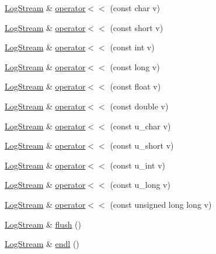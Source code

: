 \begin{DoxyCompactItemize}
\item 
\hyperlink{classkisscpp_1_1_log_stream}{Log\-Stream} \& \hyperlink{classkisscpp_1_1_log_stream_a1d015fcec83dc091a2cb474ff5d335ce}{operator$<$$<$} (const char v)
\item 
\hyperlink{classkisscpp_1_1_log_stream}{Log\-Stream} \& \hyperlink{classkisscpp_1_1_log_stream_a64e3c679c6f5392587aa5d0d30083b12}{operator$<$$<$} (const short v)
\item 
\hyperlink{classkisscpp_1_1_log_stream}{Log\-Stream} \& \hyperlink{classkisscpp_1_1_log_stream_a846256cf761f4601ef3637b6696119d7}{operator$<$$<$} (const int v)
\item 
\hyperlink{classkisscpp_1_1_log_stream}{Log\-Stream} \& \hyperlink{classkisscpp_1_1_log_stream_a82903610e544b37167f2dbd3709feeab}{operator$<$$<$} (const long v)
\item 
\hyperlink{classkisscpp_1_1_log_stream}{Log\-Stream} \& \hyperlink{classkisscpp_1_1_log_stream_adfa23ba1edc6f3d4c68169a0fd5e6ab0}{operator$<$$<$} (const float v)
\item 
\hyperlink{classkisscpp_1_1_log_stream}{Log\-Stream} \& \hyperlink{classkisscpp_1_1_log_stream_a117bd78b19cb5cb22aceda49a7e464a6}{operator$<$$<$} (const double v)
\item 
\hyperlink{classkisscpp_1_1_log_stream}{Log\-Stream} \& \hyperlink{classkisscpp_1_1_log_stream_a093fb47653a508743fbdc8849d0b3289}{operator$<$$<$} (const u\-\_\-char v)
\item 
\hyperlink{classkisscpp_1_1_log_stream}{Log\-Stream} \& \hyperlink{classkisscpp_1_1_log_stream_ac58b43508e33bf908dcd3e1ced0844a5}{operator$<$$<$} (const u\-\_\-short v)
\item 
\hyperlink{classkisscpp_1_1_log_stream}{Log\-Stream} \& \hyperlink{classkisscpp_1_1_log_stream_ac90a6103239d03af4deabb771a06ef72}{operator$<$$<$} (const u\-\_\-int v)
\item 
\hyperlink{classkisscpp_1_1_log_stream}{Log\-Stream} \& \hyperlink{classkisscpp_1_1_log_stream_a30aa88e723ce04fe2e23ce6e939671cf}{operator$<$$<$} (const u\-\_\-long v)
\item 
\hyperlink{classkisscpp_1_1_log_stream}{Log\-Stream} \& \hyperlink{classkisscpp_1_1_log_stream_ae7a5fbc7cc973038722e2c2b9de9ad1b}{operator$<$$<$} (const unsigned long long v)
\item 
\hyperlink{classkisscpp_1_1_log_stream}{Log\-Stream} \& \hyperlink{classkisscpp_1_1_log_stream_a2814d0297db8339779e995c898861e0e}{flush} ()
\item 
\hyperlink{classkisscpp_1_1_log_stream}{Log\-Stream} \& \hyperlink{classkisscpp_1_1_log_stream_ab672ebf40d6162ba7114355d2c2cc7dd}{endl} ()

\end{DoxyCompactItemize}
